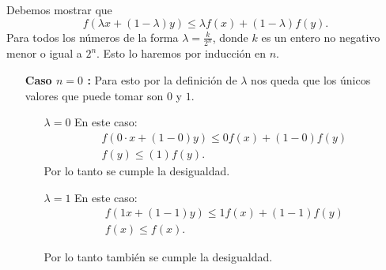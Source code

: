 \documentclass{report}
\begin{document}
Debemos mostrar que  \[
f\left( \lambda x + \left( 1 - \lambda \right) y \right) \le \lambda f\left( x \right) + \left( 1 - \lambda \right) f\left( y \right) 
.\] Para todos los números de la forma $\lambda = \frac{k}{2^{n}}$, donde $k$ es un entero no negativo menor o igual a $2^{n}$. Esto lo haremos por inducción en $n$.

\begin{enumerate}
  \item[\textbf{Caso $n = 0$ :}] Para esto por la definición de $\lambda$ nos queda que los únicos valores que puede tomar son  $0$ y $1$.
    \begin{enumerate}
      \item[$\lambda = 0$] En este caso:
	\begin{align*}
	  f\left( 0\cdot x + \left( 1 - 0 \right) y \right) \le 0 f\left( x \right) + \left( 1 - 0 \right) f\left( y \right) \\
	  f\left( y \right) \le \left( 1 \right) f\left( y \right) 
	.\end{align*}
	Por lo tanto se cumple la desigualdad.
      \item[$\lambda = 1$ ] En este caso:
	\begin{align*}
	  f\left( 1 x + \left( 1 - 1 \right) y \right) \le 1 f\left( x \right) + \left( 1 - 1 \right) f\left( y \right) \\
	  f\left( x \right) \le f\left( x \right) 
	.\end{align*}

	Por lo tanto también se cumple la desigualdad.
    \end{enumerate}


\end{enumerate}
\end{document}
